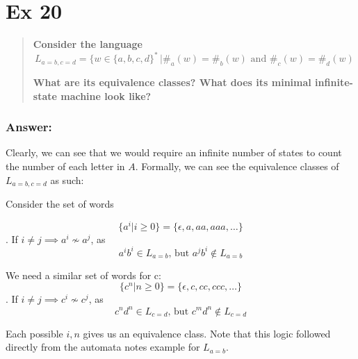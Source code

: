 \documentclass[titlepage]{article}\usepackage[]{graphicx}\usepackage[]{color}
\begin{document}
\section*{Ex 20}
\begin{quote}
  \textbf{Consider the language}
  \[ L_{a=b,c=d } = \{ w \in \{a,b, c ,d \}^* \, | \#_a (w) = \#_b (w) \text{ and }
    \#_c (w) = \#_d (w )
  \]
  
\textbf{What are its equivalence classes? What does its minimal infinite-state machine
look like?}
\end{quote}

\subsubsection{Answer:}
Clearly, we can see that we would require an infinite number of states to
count the number of each letter in $A$. Formally, we can see the equivalence
classes of $L_{a=b,c=d}$ as such:

Consider the set of words

\[ \{ a^i | i \geq 0 \} = \{ \epsilon, a, aa, aaa, \dots\} \]. 
If $i \neq j \implies a^i \not \sim a^j$, as 
\[ a^ib^i \in L_{a=b} \text{, but } a^jb^i \notin L_{a=b} \]

We need a similar set of words for c:
\[ \{ c^n | n \geq 0 \} = \{ \epsilon, c, cc, ccc, \dots\} \]. 
If $i \neq j \implies c^i \not \sim c^j$, as 
\[ c^nd^n \in L_{c=d} \text{, but } c^md^n \notin L_{c=d} \]

Each possible $i,n$ gives us an equivalence class. Note that this logic
followed directly from the automata notes example for $L_{a=b}$.
\end{document}
